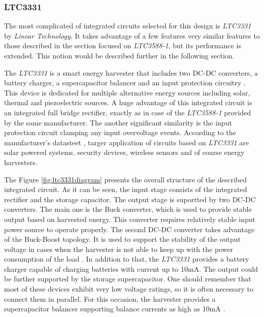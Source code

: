 \documentclass[12pt,a4paper]{article}
\begin{document}
\subsubsection{LTC3331}
The most complicated of integrated circuits selected for this design is \textit{LTC3331} by \textit{Linear Technology}. It takes advantage of a few features very similar features to those described in the section focused on \textit{LTC3588-1}, but its performance is extended. This notion would be described further in the following section.
\par
The \textit{LTC3331} is a smart energy harvester that includes two DC-DC converters, a battery charger, a supercapacitor balancer and an input protection circuitry \cite{ltc3331_params}. This device is dedicated for multiple alternative energy sources including solar, thermal and piezoelectric sources. A huge advantage of this integrated circuit is an integrated full bridge rectifier, exactly as in case of the \textit{LTC3588-1} provided by the same manufacturer. The another significant similarity is the input protection circuit clamping any input overvoltage events. According to the manufacturer's datasteet \cite{ltc3331_params}, targer application of circuits based on \textit{LTC3331} are solar powered systems, security devices, wireless sensors and of course energy harvesters.\par
The Figure \ref{fig:ltc3331diagram} presents the overall structure of the described integrated circuit. As it can be seen, the input stage consists of the integrated rectifier and the storage capacitor. The output stage is suportted by two DC-DC converters. The main one is the Buck converter, which is used to provide stable output based on harvested energy. This converter requires relatively stable input power source to operate properly. The second DC-DC converter takes advantage of the Buck-Boost topology. It is used to support the stability of the output voltage in cases when the harvester is not able to keep up with the power consumption of the load \cite{ltc3331_params}. In addition to that, the \textit{LTC3331} provides a battery charger capable of charging batteries with current up to 10mA. The output could be further supported by the storage supercapacitor. One should remember that most of these devices exhibit very low voltage ratings, so it is often necessary to connect them in parallel. For this occasion, the harvester provides a supercapacitor balancer supporting balance currents as high as 10mA \cite{ltc3331_params}.
\end{document}
